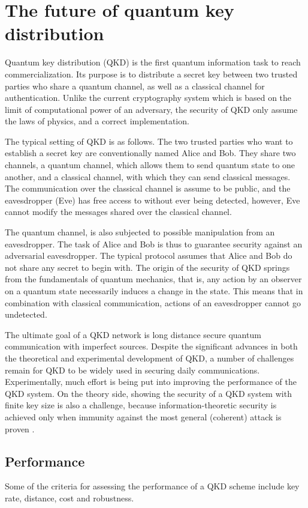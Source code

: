 \section{The future of quantum key distribution}
% 
Quantum key distribution (QKD) is the first quantum information task
to reach commercialization. Its purpose is to distribute a secret
key between two trusted parties who share a quantum channel,
as well as a classical channel for authentication. Unlike the current
cryptography system which is based on the limit of computational power of an adversary, the security of QKD only assume the laws of physics, and a 
correct implementation.


The typical setting of QKD is as follows. The two trusted parties who
want to establish a secret key are conventionally named Alice and Bob.
They share two channels, a quantum channel, which allows them to send
quantum state to one another, and a classical channel, with which they can
send classical messages. The communication over the classical channel is
assume to be public, and the eavesdropper (Eve) has free access to without 
ever being detected, however, Eve cannot modify the messages shared over
the classical channel.

 The quantum channel, is also subjected to possible manipulation from an
 eavesdropper. The task of Alice and Bob is thus to guarantee security
against an adversarial eavesdropper. The typical protocol assumes that
Alice and Bob do not share any secret to begin with.
The origin of the security of QKD springs from the fundamentals
of quantum mechanics, that is, any action by an observer on
a quantum state necessarily induces a change in the state. This means
that in combination with classical communication, actions of an eavesdropper cannot go undetected.


The ultimate goal of a QKD network is long distance secure quantum communication with imperfect sources.
% 
Despite the significant advances in both the theoretical and experimental development of QKD, a number of challenges remain for QKD to be widely used 
in securing daily communications\cite{RevModPhys.81.1301,diamanti2016practical}. Experimentally, much effort is being put into improving the performance of the QKD system. On the theory side, 
showing the security of a QKD system with finite key size is also a challenge,  
because information-theoretic security is achieved only when immunity against the most general (coherent) attack is proven \cite{diamanti2016practical}.


\subsection{Performance}
Some of the criteria for assessing the performance of a QKD scheme include key rate, distance, cost and robustness.
% 

